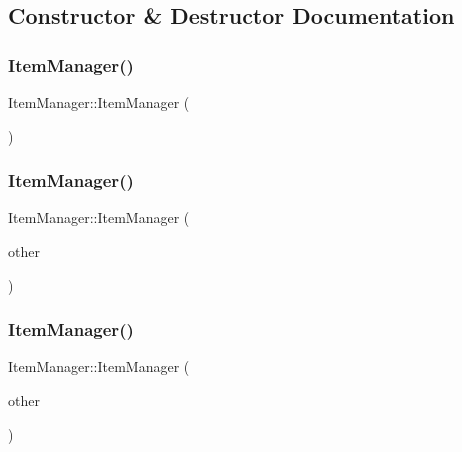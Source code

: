 \subsection{Constructor \& Destructor Documentation}
\mbox{\label{class_item_manager_a1eab68c1b49e695ba96330da469b23cc}} 
\subsubsection{\texorpdfstring{Item\+Manager()}{ItemManager()}\hspace{0.1cm}{\footnotesize\ttfamily [1/3]}}
{\footnotesize\ttfamily Item\+Manager\+::\+Item\+Manager (\begin{DoxyParamCaption}{ }\end{DoxyParamCaption})}

\mbox{\label{class_item_manager_ac6399b407125cb2e7bb0733dca40c23c}} 
\subsubsection{\texorpdfstring{Item\+Manager()}{ItemManager()}\hspace{0.1cm}{\footnotesize\ttfamily [2/3]}}
{\footnotesize\ttfamily Item\+Manager\+::\+Item\+Manager (\begin{DoxyParamCaption}\item[{\mbox{\hyperlink{class_item_manager}{Item\+Manager}} \&}]{other }\end{DoxyParamCaption})}

\mbox{\label{class_item_manager_a83c334430c14d31046389a6044f33511}} 
\subsubsection{\texorpdfstring{Item\+Manager()}{ItemManager()}\hspace{0.1cm}{\footnotesize\ttfamily [3/3]}}
{\footnotesize\ttfamily Item\+Manager\+::\+Item\+Manager (\begin{DoxyParamCaption}\item[{\mbox{\hyperlink{class_item_manager}{Item\+Manager}} \&\&}]{other }\end{DoxyParamCaption})}



